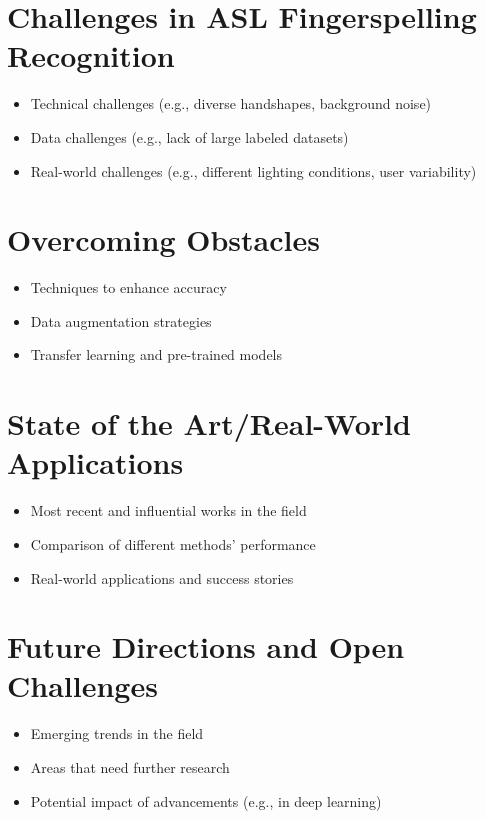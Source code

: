 \section{Challenges in ASL Fingerspelling Recognition} %
\begin{itemize}
    \item Technical challenges (e.g., diverse handshapes, background noise)
    \item Data challenges (e.g., lack of large labeled datasets)
    \item Real-world challenges (e.g., different lighting conditions, user variability)
\end{itemize}

\section{Overcoming Obstacles} %
\begin{itemize}
    \item Techniques to enhance accuracy
    \item Data augmentation strategies
    \item Transfer learning and pre-trained models
\end{itemize}

\section{State of the Art/Real-World Applications} %
\begin{itemize}
    \item Most recent and influential works in the field
    \item Comparison of different methods' performance
    \item Real-world applications and success stories
\end{itemize}

\section{Future Directions and Open Challenges} %
\begin{itemize}
    \item Emerging trends in the field
    \item Areas that need further research
    \item Potential impact of advancements (e.g., in deep learning)
\end{itemize}

